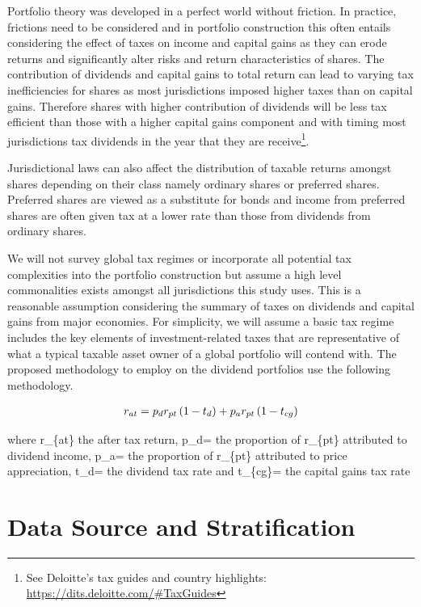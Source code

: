 \documentclass[11pt,preprint, authoryear]{elsarticle}
\numberwithin{equation}{section}
\numberwithin{figure}{section}
\numberwithin{table}{section}
\let\rmarkdownfootnote\footnote%
\def\footnote{\protect\rmarkdownfootnote}
\begin{document}
Portfolio theory was developed in a perfect world without friction. In
practice, frictions need to be considered and in portfolio construction
this often entails considering the effect of taxes on income and capital
gains as they can erode returns and significantly alter risks and return
characteristics of shares. The contribution of dividends and capital
gains to total return can lead to varying tax inefficiencies for shares
as most jurisdictions imposed higher taxes than on capital gains.
Therefore shares with higher contribution of dividends will be less tax
efficient than those with a higher capital gains component and with
timing most jurisdictions tax dividends in the year that they are
receive\footnote{See Deloitte's tax guides and country highlights:
  \url{https://dits.deloitte.com/\#TaxGuides}}.

Jurisdictional laws can also affect the distribution of taxable returns
amongst shares depending on their class namely ordinary shares or
preferred shares. Preferred shares are viewed as a substitute for bonds
and income from preferred shares are often given tax at a lower rate
than those from dividends from ordinary shares.

We will not survey global tax regimes or incorporate all potential tax
complexities into the portfolio construction but assume a high level
commonalities exists amongst all jurisdictions this study uses. This is
a reasonable assumption considering the summary of taxes on dividends
and capital gains from major economies. For simplicity, we will assume a
basic tax regime includes the key elements of investment-related taxes
that are representative of what a typical taxable asset owner of a
global portfolio will contend with. The proposed methodology to employ
on the dividend portfolios use the following methodology.

\begin{align}
r_{a t}=p_d r_{p t}\left(1-t_d\right)+p_a r_{p t}\left(1-t_{c g}\right) \notag
\end{align}

where r\_\{at\} the after tax return, p\_d= the proportion of r\_\{pt\}
attributed to dividend income, p\_a= the proportion of r\_\{pt\}
attributed to price appreciation, t\_d= the dividend tax rate and
t\_\{cg\}= the capital gains tax rate

\newpage

\hypertarget{data-source-and-stratification}{%
\section{Data Source and
Stratification}\label{data-source-and-stratification}}
\end{document}
